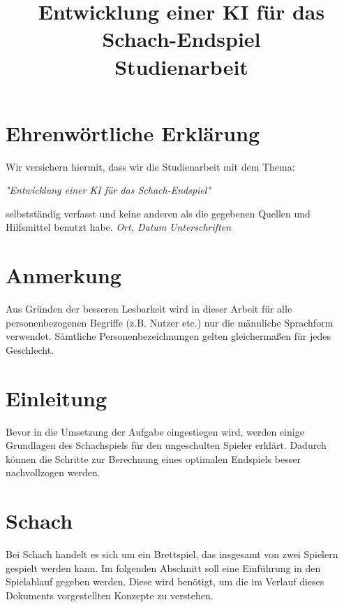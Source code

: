 \documentclass[12pt]{article}
\title{Entwicklung einer KI für das Schach-Endspiel \\ Studienarbeit}
\begin{document}
	\setcounter{page}{2}
	\section*{Ehrenwörtliche Erklärung}
	Wir versichern hiermit, dass wir die Studienarbeit mit dem Thema:
	\begin{flushleft}
		\textit{"Entwicklung einer KI für das Schach-Endspiel"}
	\end{flushleft}
	selbstständig verfasst und keine anderen als die gegebenen Quellen und Hilfsmittel benutzt habe. \tab
	\linebreak
	\linebreak
	\linebreak
	\underline{\qquad \qquad \qquad \qquad \qquad \qquad } 
	\qquad \qquad \qquad \qquad 
	\underline{\qquad \qquad \qquad \qquad \qquad \qquad } \tab
	\linebreak
	\textit{Ort, Datum} 
	\qquad \qquad \qquad \qquad \qquad \qquad \qquad \quad 
	\textit{Unterschriften}
    \pagebreak

    \listoffigures
	\section*{Anmerkung}
	Aus Gründen der besseren Lesbarkeit wird in dieser Arbeit für alle personenbezogenen Begriffe (z.B. Nutzer etc.) nur die männliche Sprachform verwendet. Sämtliche Personenbezeichnungen gelten gleichermaßen für jedes Geschlecht.
    \pagebreak
    \tableofcontents
    \pagebreak
    \hypertarget{einleitung}{%
\section{Einleitung}\label{einleitung}}

    Bevor in die Umsetzung der Aufgabe eingestiegen wird, werden einige
Grundlagen des Schachspiels für den ungeschulten Spieler erklärt.
Dadurch können die Schritte zur Berechnung eines optimalen Endspiels
besser nachvollzogen werden.

    \hypertarget{schach}{%
\section{Schach}\label{schach}}

    Bei Schach handelt es sich um ein Brettspiel, das insgesamt von zwei
Spielern gespielt werden kann. Im folgenden Abschnitt soll eine
Einführung in den Spielablauf gegeben werden. Diese wird benötigt, um
die im Verlauf dieses Dokuments vorgestellten Konzepte zu verstehen.
\end{document}
